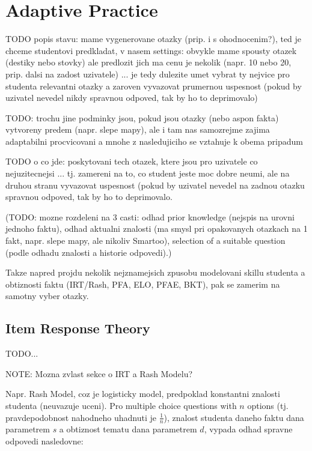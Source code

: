 \documentclass[a4paper, 12pt, twoside]{fithesis2}		%
\renewcommand{\_}{\leavevmode \kern0.0em\vbox{\hrule width0.4em}}
\newcounter{choice}
\begin{document}

\chapter{Adaptive Practice}
\label{chap:practice}

TODO popis stavu: mame vygenerovane otazky (prip. i s ohodnocenim?), ted je chceme studentovi predkladat, v nasem settings: obvykle mame spousty otazek (destiky nebo stovky) ale predlozit jich ma cenu je nekolik (napr. 10 nebo 20, prip. dalsi na zadost uzivatele) ... je tedy dulezite umet vybrat ty nejvice pro studenta relevantni otazky a zaroven vyvazovat prumernou uspesnost (pokud by uzivatel nevedel nikdy spravnou odpoved, tak by ho to deprimovalo)

TODO: trochu jine podminky jsou, pokud jsou otazky (nebo aspon fakta) vytvoreny predem (napr. slepe mapy), ale i tam nas samozrejme zajima adaptabilni procvicovani a mnohe z nasledujiciho se vztahuje k obema pripadum

TODO o co jde: poskytovani tech otazek, ktere jsou pro uzivatele co nejuzitecnejsi ... tj. zamereni na to, co student jeste moc dobre neumi, ale na druhou stranu vyvazovat uspesnost (pokud by uzivatel nevedel na zadnou otazku spravnou odpoved, tak by ho to deprimovalo.

(TODO: mozne rozdeleni na 3 casti: odhad prior knowledge (nejspis na urovni jednoho faktu), odhad aktualni znalosti (ma smysl pri opakovanych otazkach na 1 fakt, napr. slepe mapy, ale nikoliv Smartoo), selection of a suitable question (podle odhadu znalosti a historie odpovedi).)


Takze napred projdu nekolik nejznamejsich zpusobu modelovani skillu studenta a obtiznosti faktu (IRT/Rash, PFA, ELO, PFAE, BKT), pak se zamerim na samotny vyber otazky.


\section{Item Response Theory}
\label{sec:irt}


TODO...

NOTE: Mozna zvlast sekce o IRT a Rash Modelu?

Napr. Rash Model, coz je logisticky model, predpoklad konstantni znalosti studenta (neuvazuje uceni). Pro multiple choice questions with $n$ options (tj. pravdepodobnost nahodneho uhadnuti je $\frac{1}{n}$), znalost studenta daneho faktu dana parametrem $s$ a obtiznost tematu dana parametrem $d$, vypada odhad spravne odpovedi nasledovne:
\end{document}
